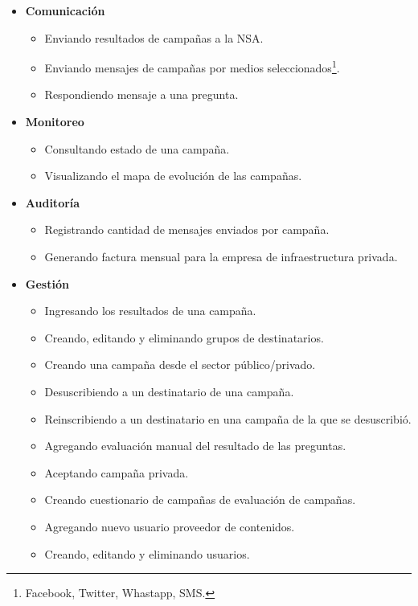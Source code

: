 \documentclass[a4paper, 10pt, twoside]{article}
\begin{document}
\begin{itemize}

\item \textbf{Comunicación}
\begin{itemize}
\item Enviando resultados de campañas a la NSA.
\item Enviando mensajes de campañas por medios seleccionados\footnote{Facebook, Twitter, Whastapp, SMS.}.
\item Respondiendo mensaje a una pregunta.
\end{itemize}

\item \textbf{Monitoreo}
\begin{itemize}
\item Consultando estado de una campaña.
\item Visualizando el mapa de evolución de las campañas.
\end{itemize}

\item \textbf{Auditoría}
\begin{itemize}
\item Registrando cantidad de mensajes enviados por campaña.
\item Generando factura mensual para la empresa de infraestructura privada.
\end{itemize}

\item \textbf{Gestión}
\begin{itemize}
\item Ingresando los resultados de una campaña.
\item Creando, editando y eliminando grupos de destinatarios.
\item Creando una campaña desde el sector público/privado.
\item Desuscribiendo a un destinatario de una campaña.
\item Reinscribiendo a un destinatario en una campaña de la que se desuscribió.
\item Agregando evaluación manual del resultado de las preguntas.
\item Aceptando campaña privada.
\item Creando cuestionario de campañas de evaluación de campañas.
\item Agregando nuevo usuario proveedor de contenidos.
\item Creando, editando y eliminando usuarios.
\end{itemize}


\end{itemize}
\end{document}
